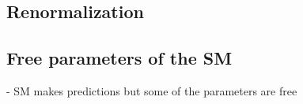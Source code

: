 \subsection{Renormalization}

\subsection{Free parameters of the SM}
- SM makes predictions but some of the parameters are free





